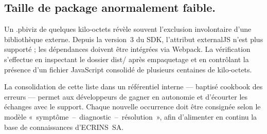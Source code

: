 \subsection{Taille de package anormalement faible.} Un .pbiviz de quelques kilo‑octets révèle souvent l’exclusion involontaire d’une bibliothèque externe. Depuis la version 3 du SDK, l’attribut externalJS n’est plus supporté ; les dépendances doivent être intégrées via Webpack. La vérification s’effectue en inspectant le dossier dist/ après empaquetage et en contrôlant la présence d’un fichier JavaScript consolidé de plusieurs centaines de kilo‑octets.


La consolidation de cette liste dans un référentiel interne — baptisé cookbook des erreurs — permet aux développeurs de gagner en autonomie et d’écourter les échanges avec le support. Chaque nouvelle occurrence doit être consignée selon le modèle « symptôme – diagnostic – résolution », afin d’alimenter en continu la base de connaissances d’ECRINS SA.
